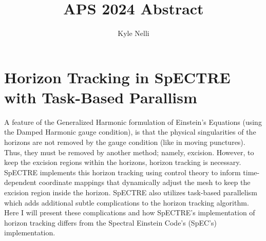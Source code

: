 \documentclass[12pt]{article}
\title{APS 2024 Abstract}
\author{Kyle Nelli}
\begin{document}
\maketitle

\section*{Horizon Tracking in SpECTRE with Task-Based Parallism}

A feature of the Generalized Harmonic formulation of Einstein's Equations (using the Damped Harmonic gauge condition), is that the physical singularities of the horizons are not removed by the gauge condition (like in moving punctures). Thus, they must be removed by another method; namely, excision. However, to keep the excision regions within the horizons, horizon tracking is necessary. SpECTRE implements this horizon tracking using control theory to inform time-dependent coordinate mappings that dynamically adjust the mesh to keep the excision region inside the horizon. SpECTRE also utilizes task-based parallelism which adds additional subtle complications to the horizon tracking algorithm. Here I will present these complications and how SpECTRE's implementation of horizon tracking differs from the Spectral Einstein Code's (SpEC's) implementation.
\end{document}
